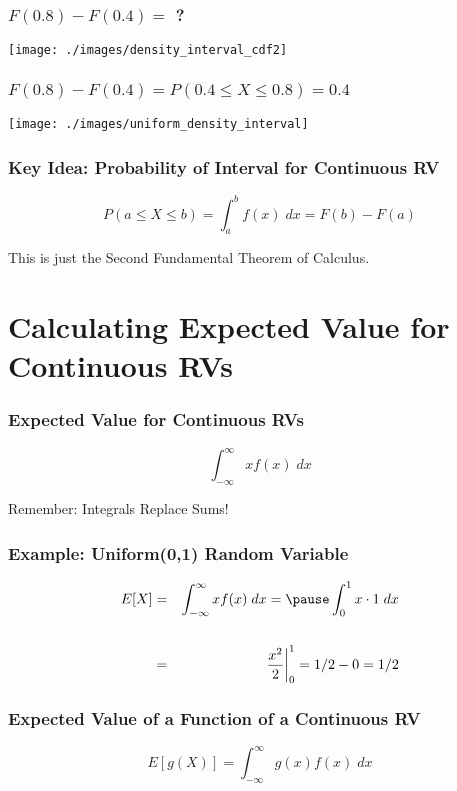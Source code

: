 \begin{frame}
\frametitle{$F(0.8) - F(0.4) = $ ?}
\centering
	\texttt{[image: ./images/density\_interval\_cdf2]}

\end{frame}


\begin{frame}
\frametitle{$F(0.8) - F(0.4) = P(0.4 \leq X \leq 0.8) = 0.4$}
\centering
	\texttt{[image: ./images/uniform\_density\_interval]}


\end{frame}
\begin{frame}
\frametitle{Key Idea: Probability of Interval for Continuous RV}

$$\boxed{P(a\leq X \leq b) = \int_a^b f(x) \; dx = F(b) - F(a)}$$

\vspace{2em}
\alert{This is just the Second Fundamental Theorem of Calculus.}
\end{frame}
\section{Calculating Expected Value for Continuous RVs}

\begin{frame}
\frametitle{Expected Value for Continuous RVs}
$$\boxed{\int_{-\infty}^\infty x f(x) \; dx  }$$

\vspace{2em}
\alert{Remember: Integrals Replace Sums!}
\end{frame}

\begin{frame}
  \frametitle{Example: Uniform(0,1) Random Variable} 
\begin{eqnarray*}
	E[X] &=&  \int_{-\infty}^\infty x f(x) \; dx =\pause  \int_{0}^1 x \cdot 1 \; dx \\ \\
		&=&  \left.\frac{x^2}{2}\right|_0^1 = 1/2  - 0 = 1/2
\end{eqnarray*}
\end{frame}
\begin{frame}
\frametitle{Expected Value of a Function of a Continuous RV}
	$$\boxed{E[g(X)] = \int_{-\infty}^\infty g(x) f(x) \; dx}$$
\end{frame}


